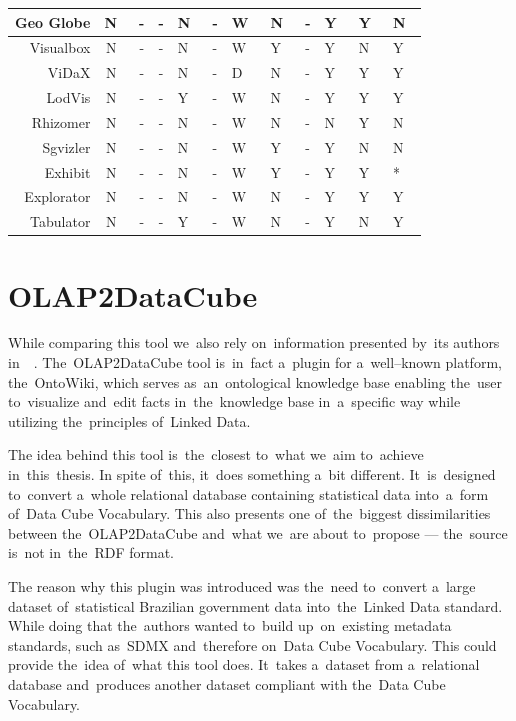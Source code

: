 \begin{table}[h]
\begin{tabularx}{\textwidth}{ |r|C|C|C|X|X|X|X|X|X|X|X| }
  Geo Globe             & N~& - & - & N~& - & W~& N~& - & Y~& Y~& N~\\ \hline
  Visualbox              & N~& - & - & N~& - & W~& Y~& - & Y~& N~& Y~\\ \hline
  ViDaX                    & N~& - & - & N~& - & D~& N~& - & Y~& Y~& Y~\\ \hline
  LodVis                   & N~& - & - & Y~& - & W~& N~& - & Y~& Y~& Y~\\ \hline
  Rhizomer              & N~& - & - & N~& - & W~& N~& - & N~& Y~& N~\\ \hline
  Sgvizler                 & N~& - & - & N~& - & W~& Y~& - & Y~& N~& N~\\ \hline
  Exhibit                  & N~& - & - & N~& - & W~& Y~& - & Y~& Y~& * \\ \hline
  Explorator             & N~& - & - & N~& - & W~& N~& - & Y~& Y~& Y~\\ \hline
  Tabulator              & N~& - & - & Y~& - & W~& N~& - & Y~& N~& Y~\\ \hline
\end{tabularx}
\end{table}

\section{OLAP2DataCube}
\label{olap2dc}
\label{rw:olap2dc}
While comparing this tool we~also rely on~information presented by~its authors in~~\cite{olap2dc-paper}. The~OLAP2DataCube tool is~in~fact a~plugin for a~well--known 
platform, the~OntoWiki, which serves as~an~ontological knowledge base enabling
the~user to~visualize and~edit facts in~the~knowledge base in~a~specific way
while utilizing the~principles of~Linked Data.

The idea behind this tool is~the~closest to~what we~aim to~achieve in~this~thesis.
In spite of~this, it~does something a~bit different. It~is~designed to~convert a~whole relational database containing statistical data into~a~form of~Data Cube 
Vocabulary. This also presents one of~the~biggest dissimilarities between the~OLAP2DataCube and~what we~are about to~propose --- the~source is~not in~the~RDF format.

The reason why this plugin was introduced was the~need to~convert a~large 
dataset of~statistical Brazilian government data into~the~Linked Data standard.
While doing that the~authors wanted to~build up~on~existing metadata standards, 
such as~SDMX and~therefore on~Data Cube Vocabulary. This could provide the~idea of~what this tool does. It~takes a~dataset from a~relational database and~produces 
another dataset compliant with the~Data Cube Vocabulary.

